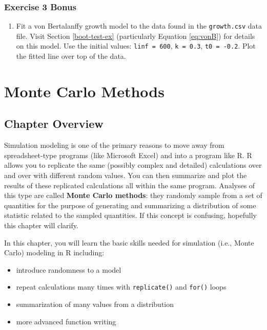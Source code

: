 \documentclass[]{book}
\providecommand{\tightlist}{%
  \setlength{\itemsep}{0pt}\setlength{\parskip}{0pt}}
\theoremstyle{definition}
\theoremstyle{definition}
\theoremstyle{definition}
\theoremstyle{remark}
\begin{document}
\subsection*{Exercise 3 Bonus}\label{exercise-3-bonus}

\begin{enumerate}
\def\labelenumi{\arabic{enumi}.}
\tightlist
\item
  Fit a von Bertalanffy growth model to the data found in the
  \texttt{growth.csv} data file. Visit Section \ref{boot-test-ex}
  (particularly Equation \eqref{eq:vonB}) for details on this model. Use
  the initial values: \texttt{linf\ =\ 600}, \texttt{k\ =\ 0.3},
  \texttt{t0\ =\ -0.2}. Plot the fitted line over top of the data.
\end{enumerate}

\chapter{Monte Carlo Methods}\label{ch4}

\section*{Chapter Overview}\label{chapter-overview-3}

Simulation modeling is one of the primary reasons to move away from
spreadsheet-type programs (like Microsoft Excel) and into a program like
R. R allows you to replicate the same (possibly complex and detailed)
calculations over and over with different random values. You can then
summarize and plot the results of these replicated calculations all
within the same program. Analyses of this type are called \textbf{Monte
Carlo methods}: they randomly sample from a set of quantities for the
purpose of generating and summarizing a distribution of some statistic
related to the sampled quantities. If this concept is confusing,
hopefully this chapter will clarify.

In this chapter, you will learn the basic skills needed for simulation
(i.e., Monte Carlo) modeling in R including:

\begin{itemize}
\tightlist
\item
  introduce randomness to a model
\item
  repeat calculations many times with \texttt{replicate()} and
  \texttt{for()} loops
\item
  summarization of many values from a distribution
\item
  more advanced function writing
\end{itemize}
\end{document}
